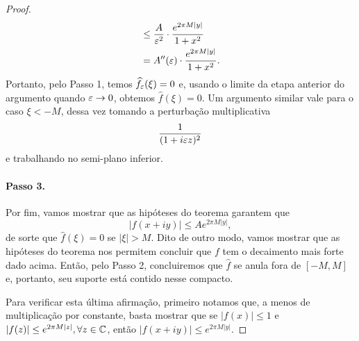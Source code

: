 \begin{proof}
\begin{align*}
                &\leq \frac{A}{\varepsilon^2}\cdot\frac{e^{2\pi M|y|}}{1 + x^2} \\
                &= A''(\varepsilon)\cdot \frac{e^{2\pi M|y|}}{1 + x^2}.
            \end{align*}
            Portanto, pelo Passo 1, temos $\widehat{f_{\varepsilon}}(\xi) = 0$ e, usando o limite da etapa anterior do argumento quando
            $\varepsilon\to 0$, obtemos $\widehat{f}(\xi) = 0$. Um argumento similar vale para o caso
            $\xi < -M$, dessa vez tomando a perturbação multiplicativa
            \begin{equation*}
                \frac{1}{(1 + i\varepsilon z)^2}
            \end{equation*}
            e trabalhando no semi-plano inferior.
            \paragraph{Passo 3.} Por fim, vamos mostrar que as hipóteses
            do teorema garantem que
            \begin{equation*}
                |f(x+iy)| \leq Ae^{2\pi M|y|},
            \end{equation*}
            de sorte que $\widehat{f}(\xi) = 0$ se $|\xi| > M$. Dito
            de outro modo, vamos mostrar que as hipóteses do teorema
            nos permitem concluir que $f$ tem o decaimento mais forte 
            dado acima.
            Então, pelo Passo 2, concluiremos que $\widehat{f}$
            se anula fora de $[-M,M]$ e, portanto, seu suporte está
            contido nesse compacto.
            
            Para verificar esta última afirmação, primeiro notamos que,
            a menos de multiplicação por constante, basta mostrar que se
            $|f(x)| \leq 1$ e $|f(z)| \leq e^{2\pi M|z|}, \forall z\in\mathbb{C}$,
            então $|f(x+iy)| \leq e^{2\pi M|y|}$.
            

\end{proof}
